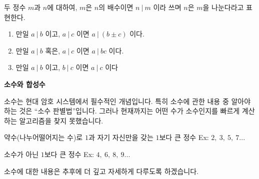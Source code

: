 \begin{tcolorbox}[colback = white, colframe = Definition, title = \textmd{정의: 배수 표현}]
    두 정수 $m$과 $n$에 대하여, $m$은 $n$의 배수이면 $n \ | \ m$ 이라 쓰며 $n$은 $m$을 나눈다라고 표현한다.
\end{tcolorbox}

\begin{tcolorbox}[colback = white, colframe = Theorem, title = \textmd{정리: 정수의 성질}]
    \begin{enumerate}
        \item 만일 $a \ | \ b$ 이고, $a \ | \ c$ 이면 $a \ | \ (b \pm c)$ 이다.
        \item 만일 $a \ | \ b$ 혹은, $a \ | \ c$ 이면 $a \ | \ bc$ 이다.
        \item 만일 $a \ | \ b$ 이고, $b \ | \ c$ 이면 $a \ | \ c$ 이다
    \end{enumerate}
\end{tcolorbox}

\newpage
\begin{flushleft}
    {\textcolor{subheader}{{\LARGE\textbf{소수와 합성수}}}}
\end{flushleft}

\begin{flushleft}
    소수는 현대 암호 시스템에서 필수적인 개념입니다. 특히 소수에 관한 내용 중 알아야 하는 것은 “소수 판별법”입니다. 그러나 현재까지는 어떤 수가 소수인지를 빠르게 계산하는 알고리즘을 찾지 못했습니다.
\end{flushleft}

\begin{tcolorbox}[colback = white, colframe = Definition, title = \textmd{정의: 소수}]
    약수(나누어떨어지는 수)로 $1$과 자기 자신만을 갖는 $1$보다 큰 정수 
    Ex: $2, \ 3, \ 5, \ 7 ...$
\end{tcolorbox}

\begin{tcolorbox}[colback = white, colframe = Definition, title = \textmd{정의: 합성수}]
    소수가 아닌 $1$보다 큰 정수 
    Ex: $4, \ 6, \ 8, \ 9 ...$
\end{tcolorbox}

\begin{flushleft}
    소수에 대한 내용은 추후에 더 깊고 자세하게 다루도록 하겠습니다.
\end{flushleft}